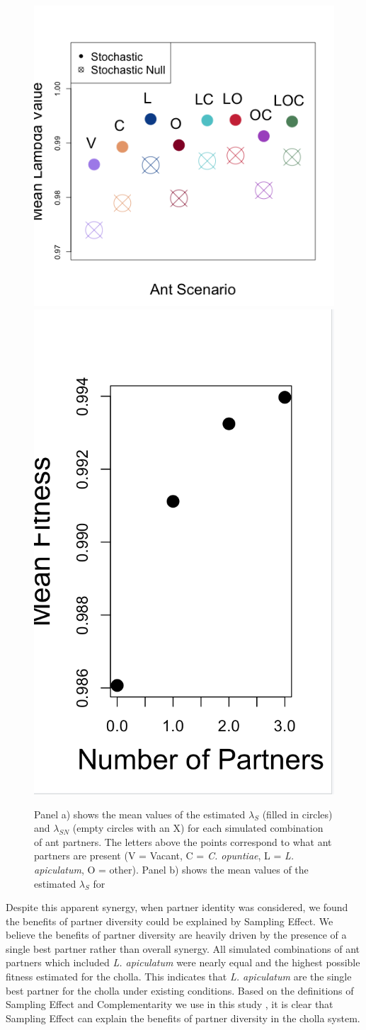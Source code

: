 \documentclass[11pt]{article}
\begin{document}
\begin{figure}
	\includegraphics[width=0.61\linewidth]{Figures/LambdaMeans.png}
	\includegraphics[width=0.39\linewidth]{Figures/Lambda_Num_Partners.png}
	\caption{Panel a) shows the mean values of the estimated $\lambda_{S}$ (filled in circles) and $\lambda_{SN}$ (empty circles with an X) for each simulated combination of ant partners. The letters above the points correspond to what ant partners are present (V = Vacant, C = \textit{C. opuntiae}, L = \textit{L. apiculatum}, O = other). Panel b) shows the mean values of the estimated $\lambda_{S}$ for }
	\label{fig:LambdaMeans}
\end{figure}

Despite this apparent synergy, when partner identity was considered, we found the benefits of partner diversity could be explained by Sampling Effect.
We believe the benefits of partner diversity are heavily driven by the presence of a single best partner rather than overall synergy.
All simulated combinations of ant partners which included \textit{L. apiculatum} were nearly equal and the highest possible fitness estimated for the cholla. 
This indicates that \textit{L. apiculatum} are the single best partner for the cholla under existing conditions. 
Based on the definitions of Sampling Effect and Complementarity we use in this study \citep{Batstone2018}, it is clear that Sampling Effect can explain the benefits of partner diversity in the cholla system. 
\end{document}
